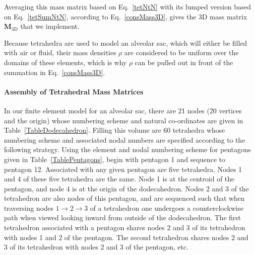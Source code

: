 Averaging this mass matrix based on Eq.~\ref{tetNtN} with its lumped version based on Eq.~\ref{tetSumNtN}, according to Eq.~\ref{consMass3D}, gives the 3D mass matrix $\mathbf{M}_{\textrm{3D}}$ that we implement.

Because tetrahedra are used to model an alveolar sac, which will either be filled with air or fluid, their mass densities $\rho$ are considered to be uniform over the domains of these elements, which is why $\rho$ can be pulled out in front of the summation in Eq.~\ref{consMass3D}.

\paragraph{Assembly of Tetrahedral Mass Matrices}

In our finite element model for an alveolar sac, there are 21 nodes (20 vertices and the origin) whose numbering scheme and natural co-ordinates are given in Table~\ref{TableDodecahedron}.  Filling this volume are 60 tetrahedra whose numbering scheme and associated nodal numbers are specified according to the following strategy.  Using the element and nodal numbering scheme for pentagons given in Table~\ref{TablePentagons}, begin with pentagon 1 and sequence to pentagon 12.  Associated with any given pentagon are five tetrahedra.  Nodes 1 and 4 of these five tetrahedra are the same.  Node 1 is at the centroid of the pentagon, and node 4 is at the origin of the dodecahedron.  Nodes 2 and 3 of the tetrahedron are also nodes of this pentagon, and are sequenced such that when traversing nodes $1 \to 2 \to 3$ of a tetrahedron one undergoes a counter\-clockwise path when viewed looking inward from outside of the dodecahedron.  The first tetrahedron associated with a pentagon shares nodes 2 and 3 of its tetrahedron with nodes 1 and 2 of the pentagon.  The second tetrahedron shares nodes 2 and 3 of its tetrahedron with nodes 2 and 3 of the pentagon, etc.

